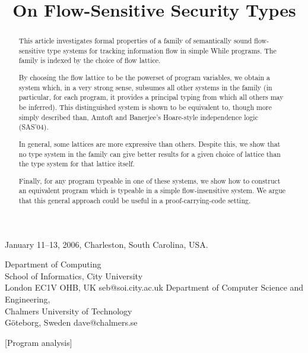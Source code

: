 \documentclass{sigplanconf}
\begin{document}
 {January 11--13, 2006, Charleston, South Carolina, USA.}



\title{On Flow-Sensitive Security Types}
        {Department of Computing\\ School of Informatics, City University\\ London EC1V OHB, UK}
        {seb\mbox{\rm @}soi.city.ac.uk} 
        {Department of Computer Science and Engineering, \\
         Chalmers University of Technology \\
         G\"oteborg, Sweden }
        {dave\mbox{\rm @}chalmers.se}

\maketitle

\begin{abstract}

This article investigates formal properties of a family of
semantically sound flow-sensitive type systems for tracking information flow in simple
While programs. The family is indexed by the choice of flow lattice.

By choosing the flow lattice to be the powerset of program variables,
we obtain a system which, in a very strong sense, subsumes all other
systems in the family (in particular, for each program, it provides
a principal typing from which all others may
be inferred).  This distinguished system is shown to be equivalent
to, though more simply described than, Amtoft and Banerjee's
Hoare-style independence logic (SAS'04).

In general, some lattices are more expressive than others. 
Despite this, we show that no type system in the family can give
better results for a given choice of lattice than the type system
for that lattice itself.

Finally, for any program typeable in one of these systems, we show
how to construct an equivalent program which is typeable in a simple
flow-insensitive system.  We argue that this general approach could
be useful in a proof-carrying-code setting.

\end{abstract}

[Program analysis]
\end{document}
